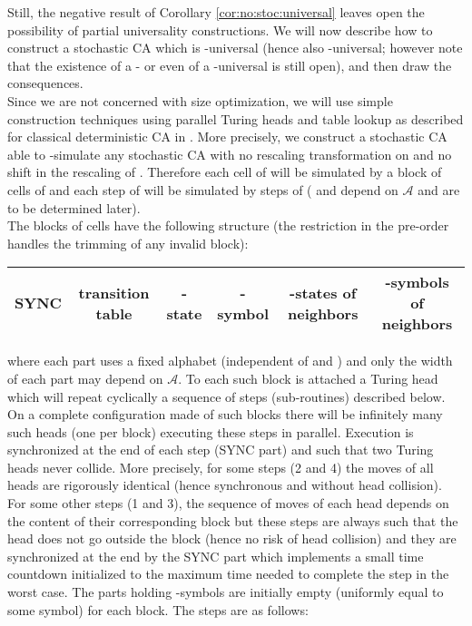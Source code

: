 \documentclass[submission]{fundam}
\newcommand\DELETE[1]{}
\newcommand{\AUTO}[1]{{\ensuremath{\mathcal{#1}}}}
\newcommand\CAA{\AUTO A}
\begin{document}
{Still, the negative result of Corollary \ref{cor:no:stoc:universal} leaves open the possibility of partial universality constructions. We will now describe how to construct a stochastic CA which is -universal (hence also -universal; however note that the existence of a  - or even of a -universal is still open), and then draw the consequences.\\
Since we are not concerned with size optimization, we will use simple construction techniques using parallel Turing heads and table lookup as described for classical deterministic CA in \cite{OllingerUnivhistory}. More precisely, we construct a stochastic CA  able to -simulate any stochastic CA  with no rescaling transformation on  and no shift in the rescaling of . Therefore each cell of  will be simulated by a block of  cells of  and each step of  will be simulated by  steps of  ( and  depend on \CAA{} and are to be determined later).\\
The blocks of  cells have the following structure (the restriction in the pre-order handles the trimming of any invalid block):
\begin{center}\scriptsize\sf
    \begin{tabular}{|c|c|c|c|c|c|}
      \hline
      SYNC & transition table & -state & -symbol & -states of neighbors & -symbols of neighbors \\
      \hline
    \end{tabular}
\end{center}
where each part uses a fixed alphabet (independent of  and ) and only the width of each part may depend on \CAA{}\DELETE{ (note that the transition table encodes in particular the size of )}. To each such block is attached a Turing head which will repeat cyclically a sequence of  steps (sub-routines) described below. On a complete configuration made of such blocks there will be infinitely many such heads (one per block) executing these steps in parallel. Execution is synchronized at the end of each step (\textsf{SYNC} part) and such that two Turing heads never collide. More precisely, for some steps (2 and 4) the moves of all heads are rigorously identical (hence synchronous and without head collision). For some other steps (1 and 3), the sequence of moves of each head depends on the content of their corresponding block but these steps are always such that the head does not go outside the block (hence no risk of head collision) and they are synchronized at the end by the \textsf{SYNC} part which implements a small time countdown initialized to the maximum time needed to complete the step in the worst case. The parts holding -symbols are initially empty (uniformly equal to some symbol) for each block. The  steps are as follows:
}
\end{document}
